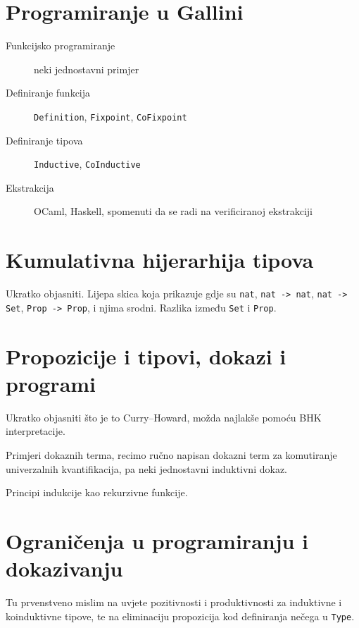 \section{Programiranje u Gallini}\label{sec:programiranje-u-gallini}
\begin{description}
\item[Funkcijsko programiranje] neki jednostavni primjer
\item[Definiranje funkcija] \texttt{Definition}, \texttt{Fixpoint}, \texttt{CoFixpoint}
\item[Definiranje tipova] \texttt{Inductive}, \texttt{CoInductive}
\item[Ekstrakcija] OCaml, Haskell, spomenuti da se radi na verificiranoj ekstrakciji
\end{description}

\section{Kumulativna hijerarhija tipova}\label{sec:kumul-hijer-tipova}
Ukratko objasniti. Lijepa skica koja prikazuje gdje su \texttt{nat}, \texttt{nat -> nat}, \texttt{nat -> Set}, \texttt{Prop -> Prop}, i njima srodni. Razlika između \texttt{Set} i \texttt{Prop}.

\section{Propozicije i tipovi, dokazi i programi}\label{sec:propozicije-i-tipovi}
Ukratko objasniti što je to Curry--Howard, možda najlakše pomoću BHK interpretacije.

Primjeri dokaznih terma, recimo ručno napisan dokazni term za komutiranje univerzalnih kvantifikacija, pa neki jednostavni induktivni dokaz.

Principi indukcije kao rekurzivne funkcije.

\section{Ograničenja u programiranju i dokazivanju}\label{sec:ogranicenja}
Tu prvenstveno mislim na uvjete pozitivnosti i produktivnosti za induktivne i koinduktivne tipove,
te na eliminaciju propozicija kod definiranja nečega u \texttt{Type}.

